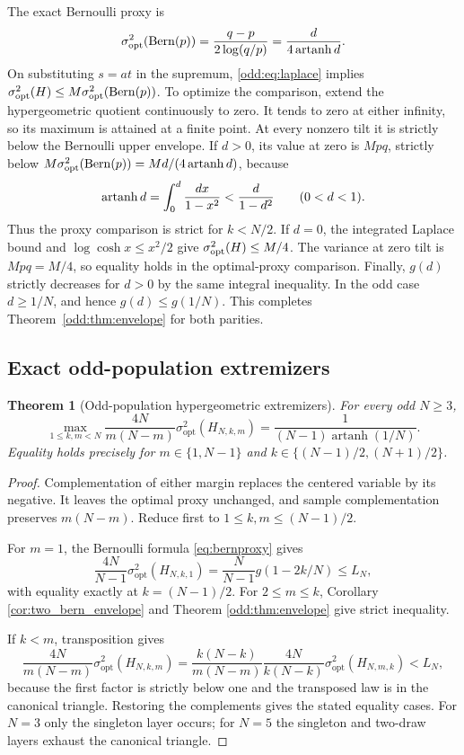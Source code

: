 \documentclass[11pt,a4paper]{article}
\newtheorem{theorem}{Theorem}[section]
\begin{document}
The exact Bernoulli proxy is
\begin{equation}\label{odd:eq:bern}
 \sigma^2_{\rm opt}(\operatorname{Bern}(p))=\frac{q-p}{2\log(q/p)}
 =\frac{d}{4\operatorname{artanh} d}.
\end{equation}
On substituting $s=at$ in the supremum, \eqref{odd:eq:laplace} implies
$\sigma^2_{\rm opt}(H)\le M\sigma^2_{\rm opt}(\operatorname{Bern}(p))$.
To optimize the comparison, extend the hypergeometric quotient continuously to zero. It tends to zero at either infinity, so its maximum is attained at a finite point. At every nonzero tilt it is strictly below the Bernoulli upper envelope. If $d>0$, its value at zero is $Mpq$, strictly below $M\sigma^2_{\rm opt}(\operatorname{Bern}(p))=Md/(4\operatorname{artanh} d)$, because
\[
 \operatorname{artanh} d=\int_0^d\frac{dx}{1-x^2}<\frac{d}{1-d^2}\qquad(0<d<1).
\]
Thus the proxy comparison is strict for $k<N/2$. If $d=0$, the integrated Laplace bound and $\log\cosh x\le x^2/2$ give $\sigma^2_{\rm opt}(H)\le M/4$. The variance at zero tilt is $Mpq=M/4$, so equality holds in the optimal-proxy comparison. Finally, $g(d)$ strictly decreases for $d>0$ by the same integral inequality. In the odd case $d\ge1/N$, and hence $g(d)\le g(1/N)$. This completes Theorem~\ref{odd:thm:envelope} for both parities.

\subsection{Exact odd-population extremizers}
\begin{theorem}[Odd-population hypergeometric extremizers]\label{odd:thm:odd}
For every odd $N\ge3$,
\begin{equation}\label{odd:eq:exact}
 \boxed{\quad
 \max_{1\le k,m<N}\frac{4N}{m(N-m)}\sigma^2_{\mathrm{opt}}(H_{N,k,m})
 =\frac{1}{(N-1)\operatorname{artanh}(1/N)}.\quad}
\end{equation}
Equality holds precisely for $m\in\{1,N-1\}$ and $k\in\{(N-1)/2,(N+1)/2\}$.
\end{theorem}
\begin{proof}
Complementation of either margin replaces the centered variable by its negative. It leaves the optimal proxy unchanged, and sample complementation preserves $m(N-m)$. Reduce first to $1\le k,m\le(N-1)/2$.

For $m=1$, the Bernoulli formula \eqref{eq:bernproxy} gives
\[
 \frac{4N}{N-1}\sigma^2_{\mathrm{opt}}(H_{N,k,1})
 =\frac{N}{N-1}g(1-2k/N)\le L_N,
\]
with equality exactly at $k=(N-1)/2$. For $2\le m\le k$, Corollary \ref{cor:two_bern_envelope} and Theorem \ref{odd:thm:envelope} give strict inequality.

If $k<m$, transposition gives
\[
 \frac{4N}{m(N-m)}\sigma^2_{\mathrm{opt}}(H_{N,k,m})
 =\frac{k(N-k)}{m(N-m)}
 \frac{4N}{k(N-k)}\sigma^2_{\mathrm{opt}}(H_{N,m,k})<L_N,
\]
because the first factor is strictly below one and the transposed law is in the canonical triangle. Restoring the complements gives the stated equality cases. For $N=3$ only the singleton layer occurs; for $N=5$ the singleton and two-draw layers exhaust the canonical triangle.
\end{proof}
\end{document}
